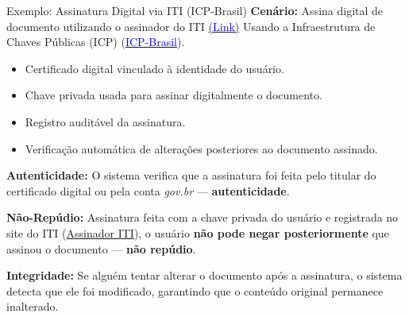 \begin{frame}{Exemplo: Assinatura Digital via ITI (ICP-Brasil)}
    \textbf{Cenário:} Assina digital de documento utilizando o assinador do ITI \href{https://www.gov.br/iti/pt-br}{\textcolor{blue}{(Link)}}
    Usando a Infraestrutura de Chaves Públicas (ICP) (\href{https://www.gov.br/iti/pt-br/assuntos/icp-brasil}{\textcolor{blue}{ICP-Brasil}}).


    \begin{itemize}
        \item Certificado digital vinculado à identidade do usuário.
        \item Chave privada usada para assinar digitalmente o documento.
        \item Registro auditável da assinatura.
        \item Verificação automática de alterações posteriores ao documento assinado.
    \end{itemize}

    \medskip
    \textbf{Autenticidade:}
    O sistema verifica que a assinatura foi feita pelo titular do certificado digital ou pela conta \textit{gov.br}
    — \textbf{autenticidade}.

    \medskip
    \textbf{Não-Repúdio:}
    Assinatura feita com a chave privada do usuário e registrada no site do ITI (\href{https://assinador.iti.br}{Assinador ITI}), o usuário \textbf{não pode negar posteriormente} que assinou o documento — \textbf{não repúdio}.

    \medskip
    \textbf{Integridade:}
    Se alguém tentar alterar o documento após a assinatura, o sistema detecta que ele foi modificado, garantindo que o conteúdo original permanece inalterado.



\end{frame}



